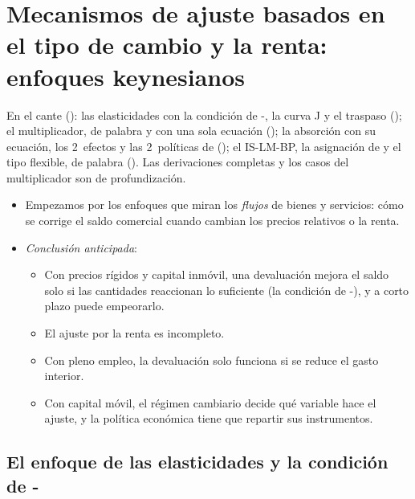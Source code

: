 \documentclass[11pt]{article}
\begin{document}
\section{Mecanismos de ajuste basados en el tipo de cambio y la renta:\cortetitulo{} enfoques keynesianos}\label{sec:flujos}

\begin{notaopositor}
En el cante (): las elasticidades con la condición de -, la curva J y el traspaso (); el multiplicador, de palabra y con una sola ecuación (); la absorción con su ecuación, los 2~efectos y las 2~políticas de  (); el IS-LM-BP, la asignación de  y el tipo flexible, de palabra (). Las derivaciones completas y los casos del multiplicador son de profundización.
\end{notaopositor}

\begin{itemize}
\item Empezamos por los enfoques que miran los \emph{flujos} de bienes y servicios: cómo se corrige el saldo comercial cuando cambian los precios relativos o la renta.
\item \emph{Conclusión anticipada}:
  \begin{itemize}
  \item Con precios rígidos y capital inmóvil, una devaluación mejora el saldo solo si las cantidades reaccionan lo suficiente (la condición de -), y a corto plazo puede empeorarlo.
  \item El ajuste por la renta es incompleto.
  \item Con pleno empleo, la devaluación solo funciona si se reduce el gasto interior.
  \item Con capital móvil, el régimen cambiario decide qué variable hace el ajuste, y la política económica tiene que repartir sus instrumentos.
  \end{itemize}
\end{itemize}

\subsection{El enfoque de las elasticidades\cortetitulo{} y la condición de -}\label{sec:elasticidades}
\end{document}

